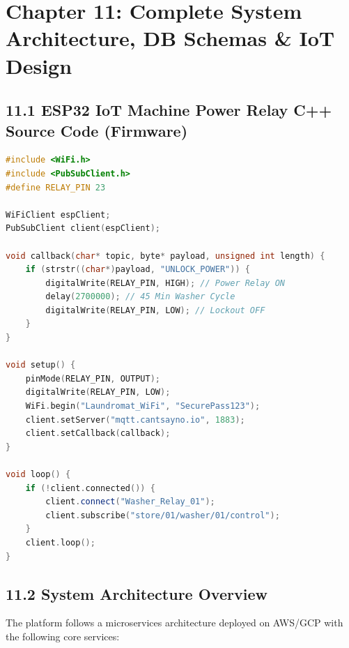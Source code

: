 \documentclass[11pt,a4paper]{article}
\begin{document}
\section{Chapter 11: Complete System Architecture, DB Schemas \& IoT Design}

\subsection{11.1 ESP32 IoT Machine Power Relay C++ Source Code (Firmware)}

\begin{lstlisting}[language=C++]
#include <WiFi.h>
#include <PubSubClient.h>
#define RELAY_PIN 23

WiFiClient espClient;
PubSubClient client(espClient);

void callback(char* topic, byte* payload, unsigned int length) {
    if (strstr((char*)payload, "UNLOCK_POWER")) {
        digitalWrite(RELAY_PIN, HIGH); // Power Relay ON
        delay(2700000); // 45 Min Washer Cycle
        digitalWrite(RELAY_PIN, LOW); // Lockout OFF
    }
}

void setup() {
    pinMode(RELAY_PIN, OUTPUT);
    digitalWrite(RELAY_PIN, LOW);
    WiFi.begin("Laundromat_WiFi", "SecurePass123");
    client.setServer("mqtt.cantsayno.io", 1883);
    client.setCallback(callback);
}

void loop() {
    if (!client.connected()) {
        client.connect("Washer_Relay_01");
        client.subscribe("store/01/washer/01/control");
    }
    client.loop();
}
\end{lstlisting}

\subsection{11.2 System Architecture Overview}
The platform follows a microservices architecture deployed on AWS/GCP with the following core services:
\end{document}
